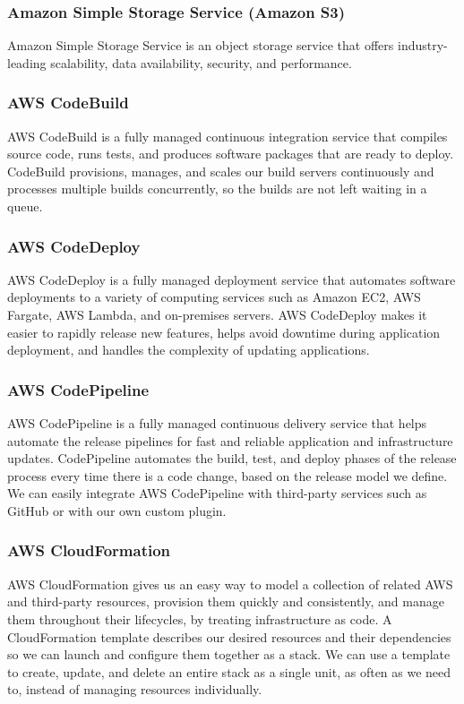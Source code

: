 \subsubsection{Amazon Simple Storage Service (Amazon S3)}
%
Amazon Simple Storage Service is an object storage service that offers industry-leading scalability, data availability, security, and performance. 
%

\subsubsection{AWS CodeBuild}
%
AWS CodeBuild is a fully managed continuous integration service that compiles source code, runs tests, and produces software packages that are ready to deploy. CodeBuild provisions, manages, and scales our build servers continuously and processes multiple builds concurrently, so the builds are not left waiting in a queue.  
%

\subsubsection{AWS CodeDeploy}
%
AWS CodeDeploy is a fully managed deployment service that automates software deployments to a variety of computing services such as Amazon EC2, AWS Fargate, AWS Lambda, and on-premises servers. AWS CodeDeploy makes it easier to rapidly release new features, helps avoid downtime during application deployment, and handles the complexity of updating applications. 
%

\subsubsection{AWS CodePipeline}
%
AWS CodePipeline is a fully managed continuous delivery service that helps automate the release pipelines for fast and reliable application and infrastructure updates. CodePipeline automates the build, test, and deploy phases of the release process every time there is a code change, based on the release model we define. We can easily integrate AWS CodePipeline with third-party services such as GitHub or with our own custom plugin.
%

\subsubsection{AWS CloudFormation}
%
AWS CloudFormation gives us an easy way to model a collection of related AWS and third-party resources, provision them quickly and consistently, and manage them throughout their lifecycles, by treating infrastructure as code. A CloudFormation template describes our desired resources and their dependencies so we can launch and configure them together as a stack. We can use a template to create, update, and delete an entire stack as a single unit, as often as we need to, instead of managing resources individually. 
%

